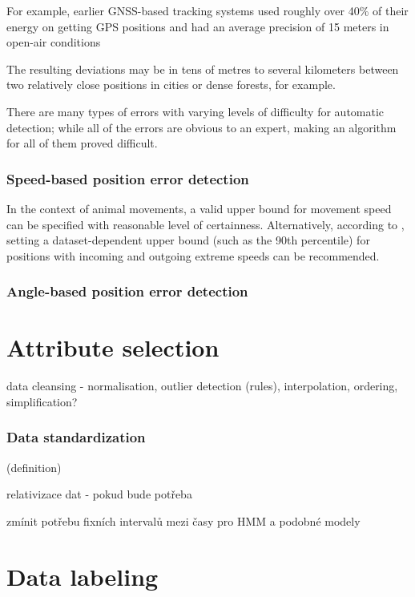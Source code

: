 For example, earlier GNSS-based tracking systems used roughly over 40\% of their energy on getting GPS positions and had an average precision of 15 meters in open-air conditions \cite{jain2008wildcense}

The resulting deviations may be in tens of metres to several kilometers between two relatively close positions in cities or dense forests, for example.

There are many types of errors with varying levels of difficulty for automatic detection; while all of the errors are obvious to an expert, making an algorithm for all of them proved difficult.

\subsubsection{Speed-based position error detection}

In the context of animal movements, a valid upper bound for movement speed can be specified with reasonable level of certainness. Alternatively, according to \citeauthor{gupte2022guide}, setting a dataset-dependent upper bound (such as the 90th percentile) for positions with incoming and outgoing extreme speeds can be recommended. 

\subsubsection{Angle-based position error detection}


\section{Attribute selection}

data cleansing - normalisation, outlier detection (rules), interpolation, ordering, simplification?

\subsubsection{Data standardization}

(definition)

relativizace dat - pokud bude potřeba

zmínit potřebu fixních intervalů mezi časy pro HMM a podobné modely

\section{Data labeling}

